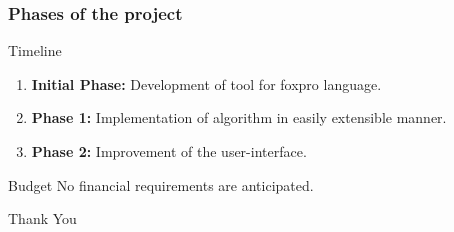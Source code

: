\documentclass[english,handout]{beamer}
\begin{document}
\begin{frame}
\frametitle{Phases of the project}
\begin{block}{Timeline}
\begin{enumerate}
\item{\textbf{Initial Phase:}}
Development of tool for foxpro language.
\item{\textbf{Phase 1:}}
Implementation of algorithm in easily extensible manner.
\item{\textbf{Phase 2:}}
Improvement of the user-interface.
\end{enumerate}
\end{block}
\begin{block}{Budget}
No financial requirements are anticipated.
\end{block}
\end{frame}
\begin{frame}
\vfill
\begin{center}
\huge{Thank You}
\end{center}
\vfill
\end{frame}
\end{document}
